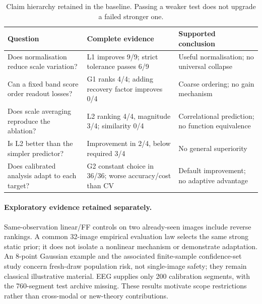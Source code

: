 \begin{table}[t]\centering\small
\caption{Claim hierarchy retained in the baseline. Passing a weaker test does not upgrade a failed stronger one.}\label{tab:claims-main}
\begin{tabular}{p{}p{}p{}}\toprule
Question & Complete evidence & Supported conclusion\\\midrule
Does normalisation reduce scale variation? & L1 improves 9/9; strict tolerance passes 6/9 & Useful normalisation; no universal collapse\\
Can a fixed band score order readout losses? & G1 ranks 4/4; adding recovery factor improves 0/4 & Coarse ordering; no gain mechanism\\
Does scale averaging reproduce the ablation? & L2 ranking 4/4, magnitude 3/4; similarity 0/4 & Correlational prediction; no function equivalence\\
Is L2 better than the simpler predictor? & Improvement in 2/4, below required 3/4 & No general superiority\\
Does calibrated analysis adapt to each target? & G2 constant choice in 36/36; worse accuracy/cost than CV & Default improvement; no adaptive advantage\\\bottomrule
\end{tabular}
\end{table}

\paragraph{Exploratory evidence retained separately.} Same-observation linear/FF controls on two already-seen images include reverse rankings. A common 32-image empirical evaluation law selects the same strong static prior; it does not isolate a nonlinear mechanism or demonstrate adaptation. An 8-point Gaussian example and the associated finite-sample confidence-set study concern fresh-draw population risk, not single-image safety; they remain classical illustrative material. EEG supplies only 200 calibration segments, with the 760-segment test archive missing. These results motivate scope restrictions rather than cross-modal or new-theory contributions.

